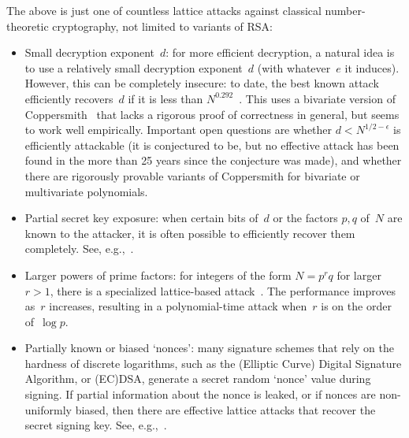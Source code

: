 \documentclass[11pt]{article}
\begin{document}
The above is just one of countless lattice attacks against classical
number-theoretic cryptography, not limited to variants of RSA:
\begin{itemize}[itemsep=0pt]
\item Small decryption exponent~$d$: for more efficient decryption, a
  natural idea is to use a relatively small decryption exponent~$d$
  (with whatever~$e$ it induces). However, this can be completely
  insecure: to date, the best known attack efficiently recovers~$d$ if
  it is less than $N^{0.292}$~\cite{DBLP:journals/tit/BonehD00}. This
  uses a bivariate version of
  Coppersmith~\cite{DBLP:conf/eurocrypt/Coppersmith96a} that lacks a
  rigorous proof of correctness in general, but seems to work well
  empirically. Important open questions are whether
  $d < N^{1/2-\epsilon}$ is efficiently attackable (it is conjectured
  to be, but no effective attack has been found in the more than 25
  years since the conjecture was made), and whether there are
  rigorously provable variants of Coppersmith for bivariate or
  multivariate polynomials.

\item Partial secret key exposure: when certain bits of~$d$ or the
  factors $p,q$ of~$N$ are known to the attacker, it is often possible
  to efficiently recover them completely. See,
  e.g.,~\cite{DBLP:conf/eurocrypt/Coppersmith96a,DBLP:conf/asiacrypt/BonehDF98}.

\item Larger powers of prime factors: for integers of the form
  $N=p^{r} q$ for larger $r > 1$, there is a specialized lattice-based
  attack~\cite{DBLP:conf/crypto/BonehDH99}. The performance improves
  as~$r$ increases, resulting in a polynomial-time attack when~$r$ is
  on the order of~$\log p$.

\item Partially known or biased `nonces': many signature schemes that
  rely on the hardness of discrete logarithms, such as the (Elliptic
  Curve) Digital Signature Algorithm, or (EC)DSA, generate a secret
  random `nonce' value during signing. If partial information about
  the nonce is leaked, or if nonces are non-uniformly biased, then
  there are effective lattice attacks that recover the secret signing
  key. See,
  e.g.,~\cite{DBLP:journals/dcc/Howgrave-GrahamS01,DBLP:journals/joc/NguyenS02,DBLP:journals/dcc/NguyenS03}.
\end{itemize}



\end{document}
